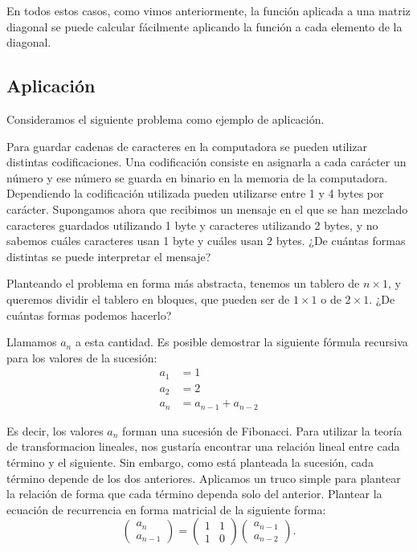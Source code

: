 En todos estos casos, como vimos anteriormente, la función aplicada a
una matriz diagonal se puede calcular fácilmente aplicando la función a
cada elemento de la diagonal.


\subsection{Aplicación}

Consideramos el siguiente problema como ejemplo de aplicación.

Para guardar cadenas de caracteres en la computadora se pueden utilizar distintas codificaciones. Una codificación consiste en asignarla a cada carácter un número y ese número se guarda en binario en la memoria de la computadora. Dependiendo la codificación utilizada pueden utilizarse entre 1 y 4 bytes por carácter.
Supongamos ahora que recibimos un mensaje en el que se han mezclado caracteres guardados utilizando 1 byte y caracteres utilizando 2 bytes, y no sabemos cuáles caracteres usan 1 byte y cuáles usan 2 bytes. ¿De cuántas formas distintas se puede interpretar el mensaje?

Planteando el problema en forma más abstracta, tenemos un tablero de $n \times 1$, y queremos dividir el tablero en bloques, que pueden ser de $1 \times 1$ o de $2 \times 1$. ¿De cuántas formas podemos hacerlo?

Llamamos $a_n$ a esta cantidad. Es posible demostrar la siguiente fórmula recursiva para los valores de la sucesión:
$$
\begin{aligned}
a_1 &= 1 \\
a_2 &= 2 \\
a_{n} &= a_{n-1} + a_{n-2}
\end{aligned}
$$

Es decir, los valores $a_n$ forman una sucesión de Fibonacci. Para utilizar la teoría de transformacion lineales, nos gustaría encontrar una relación lineal entre cada término y el siguiente. Sin embargo, como está planteada la sucesión, cada término depende de los dos anteriores. Aplicamos un truco simple para plantear la relación de forma que cada término dependa solo del anterior. Plantear la ecuación de recurrencia en forma matricial de la siguiente forma:
$$
\begin{pmatrix} a_{n} \\ a_{n-1} \end{pmatrix} =
\begin{pmatrix} 1 & 1 \\ 1 & 0 \end{pmatrix} \begin{pmatrix} a_{n-1} \\ a_{n-2} \end{pmatrix}.
$$

